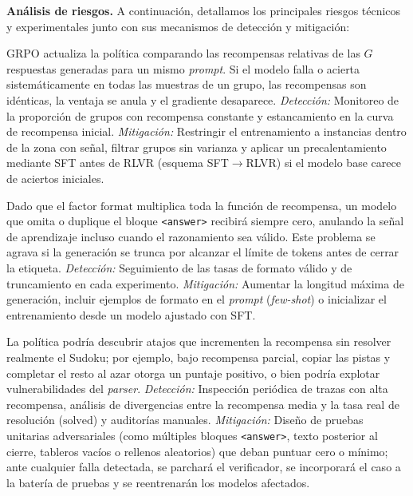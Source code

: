\documentclass[letterpaper,11pt]{article}
\begin{document}
\textbf{Análisis de riesgos.} A continuación, detallamos los principales riesgos técnicos y experimentales junto con sus mecanismos de detección y mitigación:
\begin{description}[leftmargin=0pt]
  \item[Ausencia de señal en RL.] GRPO actualiza la política comparando las recompensas relativas de las $G$ respuestas generadas para un mismo \emph{prompt}. Si el modelo falla o acierta sistemáticamente en todas las muestras de un grupo, las recompensas son idénticas, la ventaja se anula y el gradiente desaparece. \emph{Detección:} Monitoreo de la proporción de grupos con recompensa constante y estancamiento en la curva de recompensa inicial. \emph{Mitigación:} Restringir el entrenamiento a instancias dentro de la zona con señal, filtrar grupos sin varianza y aplicar un precalentamiento mediante SFT antes de RLVR (esquema SFT$\to$RLVR) si el modelo base carece de aciertos iniciales.

  \item[Incumplimiento del formato de salida.] Dado que el factor $\text{format}$ multiplica toda la función de recompensa, un modelo que omita o duplique el bloque \texttt{<answer>} recibirá siempre cero, anulando la señal de aprendizaje incluso cuando el razonamiento sea válido. Este problema se agrava si la generación se trunca por alcanzar el límite de tokens antes de cerrar la etiqueta. \emph{Detección:} Seguimiento de las tasas de formato válido y de truncamiento en cada experimento. \emph{Mitigación:} Aumentar la longitud máxima de generación, incluir ejemplos de formato en el \emph{prompt} (\emph{few-shot}) o inicializar el entrenamiento desde un modelo ajustado con SFT.

  \item[\emph{Reward hacking}.] La política podría descubrir atajos que incrementen la recompensa sin resolver realmente el Sudoku; por ejemplo, bajo recompensa parcial, copiar las pistas y completar el resto al azar otorga un puntaje positivo, o bien podría explotar vulnerabilidades del \emph{parser}. \emph{Detección:} Inspección periódica de trazas con alta recompensa, análisis de divergencias entre la recompensa media y la tasa real de resolución ($\text{solved}$) y auditorías manuales. \emph{Mitigación:} Diseño de pruebas unitarias adversariales (como múltiples bloques \texttt{<answer>}, texto posterior al cierre, tableros vacíos o rellenos aleatorios) que deban puntuar cero o mínimo; ante cualquier falla detectada, se parchará el verificador, se incorporará el caso a la batería de pruebas y se reentrenarán los modelos afectados.


\end{description}
\end{document}
